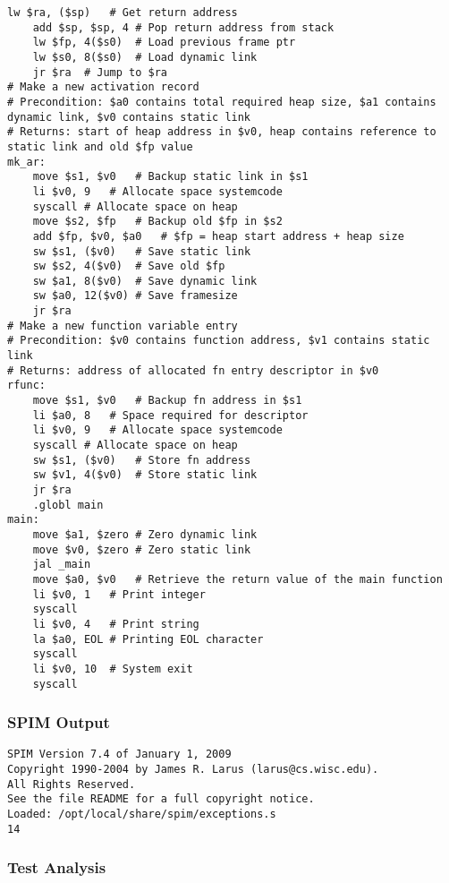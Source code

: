 \begin{lstlisting}[showstringspaces=false,breaklines=true,backgroundcolor=\color{light-gray}, captionpos=b]
	lw $ra, ($sp)	# Get return address
	add $sp, $sp, 4	# Pop return address from stack
	lw $fp, 4($s0)	# Load previous frame ptr
	lw $s0, 8($s0)	# Load dynamic link
	jr $ra	# Jump to $ra
# Make a new activation record
# Precondition: $a0 contains total required heap size, $a1 contains dynamic link, $v0 contains static link
# Returns: start of heap address in $v0, heap contains reference to static link and old $fp value
mk_ar:
	move $s1, $v0	# Backup static link in $s1
	li $v0, 9	# Allocate space systemcode
	syscall	# Allocate space on heap
	move $s2, $fp	# Backup old $fp in $s2
	add $fp, $v0, $a0	# $fp = heap start address + heap size
	sw $s1, ($v0)	# Save static link
	sw $s2, 4($v0)	# Save old $fp
	sw $a1, 8($v0)	# Save dynamic link
	sw $a0, 12($v0)	# Save framesize
	jr $ra
# Make a new function variable entry
# Precondition: $v0 contains function address, $v1 contains static link
# Returns: address of allocated fn entry descriptor in $v0
rfunc:
	move $s1, $v0	# Backup fn address in $s1
	li $a0, 8	# Space required for descriptor
	li $v0, 9	# Allocate space systemcode
	syscall	# Allocate space on heap
	sw $s1, ($v0)	# Store fn address
	sw $v1, 4($v0)	# Store static link
	jr $ra
	.globl main
main:
	move $a1, $zero	# Zero dynamic link
	move $v0, $zero	# Zero static link
	jal _main
	move $a0, $v0	# Retrieve the return value of the main function
	li $v0, 1	# Print integer
	syscall
	li $v0, 4	# Print string
	la $a0, EOL	# Printing EOL character
	syscall
	li $v0, 10	# System exit
	syscall

\end{lstlisting}\subsubsection{SPIM Output}
\begin{verbatim}
SPIM Version 7.4 of January 1, 2009
Copyright 1990-2004 by James R. Larus (larus@cs.wisc.edu).
All Rights Reserved.
See the file README for a full copyright notice.
Loaded: /opt/local/share/spim/exceptions.s
14
\end{verbatim}\subsubsection{Test Analysis}

